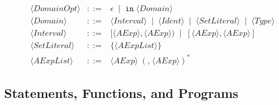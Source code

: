 \documentclass{article}
\begin{document}
\[\begin{array}{rcl}
\langle \mathit{DomainOpt} \rangle
&::=&
\epsilon
\;\mid\;
\mathtt{in}\;\langle \mathit{Domain} \rangle \\[4pt]

\langle \mathit{Domain} \rangle
&::=&
\langle \mathit{Interval} \rangle
\;\mid\;
\langle \mathit{Ident} \rangle
\;\mid\;
\langle \mathit{SetLiteral} \rangle
\;\mid\;
\langle \mathit{Type} \rangle \\[4pt]

\langle \mathit{Interval} \rangle
&::=&
[\langle \mathit{AExp} \rangle,\langle \mathit{AExp} \rangle)
\;\mid\;
[\langle \mathit{AExp} \rangle,\langle \mathit{AExp} \rangle] \\[4pt]

\langle \mathit{SetLiteral} \rangle
&::=&
\{\langle \mathit{AExpList} \rangle\} \\[4pt]

\langle \mathit{AExpList} \rangle
&::=&
\langle \mathit{AExp} \rangle\;(\texttt{,}\;\langle \mathit{AExp} \rangle)^*
\end{array}
\]

\subsection{Statements, Functions, and Programs}
\end{document}

